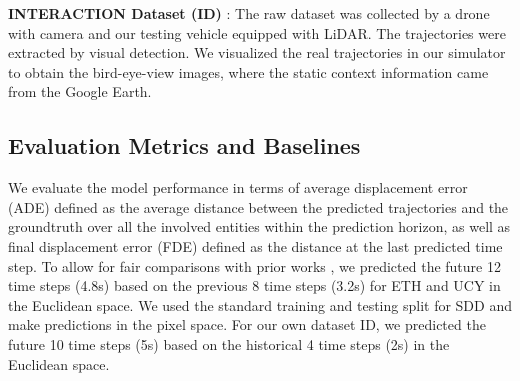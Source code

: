 \documentclass[letterpaper, 10 pt, conference]{ieeeconf}
\begin{document}
\vspace{0.1cm}
\noindent
\textbf{INTERACTION Dataset (ID)} \cite{Wei_IROS19,Wei_INTERACTION_19}: The raw dataset was collected by a drone with camera and our testing vehicle equipped with LiDAR. The trajectories were extracted by visual detection. We visualized the real trajectories in our simulator to obtain the bird-eye-view images, where the static context information came from the Google Earth. 

\subsection{Evaluation Metrics and Baselines}
We evaluate the model performance in terms of average displacement error (ADE) defined as the average distance between the predicted trajectories and the groundtruth over all the involved entities within the prediction horizon, as well as final displacement error (FDE) defined as the distance at the last predicted time step.
To allow for fair comparisons with prior works \cite{A1,A8,A9}, we predicted the future 12 time steps (4.8s) based on the previous 8 time steps (3.2s) for ETH and UCY in the Euclidean space. We used the standard training and testing split for SDD and make predictions in the pixel space.
For our own dataset ID, we predicted the future 10 time steps (5s) based on the historical 4 time steps (2s) in the Euclidean space.
\end{document}
